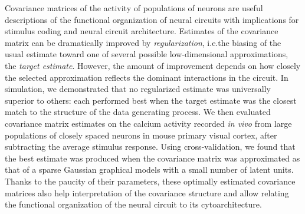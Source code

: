Covariance matrices of the activity of populations of neurons are useful descriptions of the functional organization of neural circuits with implications for stimulus coding and neural circuit architecture. 
Estimates of the covariance matrix can be dramatically improved by \emph{regularization}, i.e.\;the biasing of the usual estimate toward one of several possible low-dimensional approximations, the \emph{target estimate}. However, the amount of improvement depends on how closely the selected approximation reflects the dominant interactions in the circuit. 
In simulation, we demonstrated that no regularized estimate was universally superior to others: each performed best when the target estimate was the closest match to the structure of the data generating process. 
We then evaluated covariance matrix estimates on the calcium activity recorded \emph{in vivo} from large populations of closely spaced neurons  in mouse primary visual cortex, after subtracting the average stimulus response.
Using cross-validation, we found that the best estimate was produced when the covariance matrix was approximated as that of a sparse Gaussian graphical models with a small number of latent units. 
Thanks to the paucity of their parameters, these optimally estimated covariance matrices also help interpretation of the covariance structure and allow relating the functional organization of the neural circuit to its cytoarchitecture.